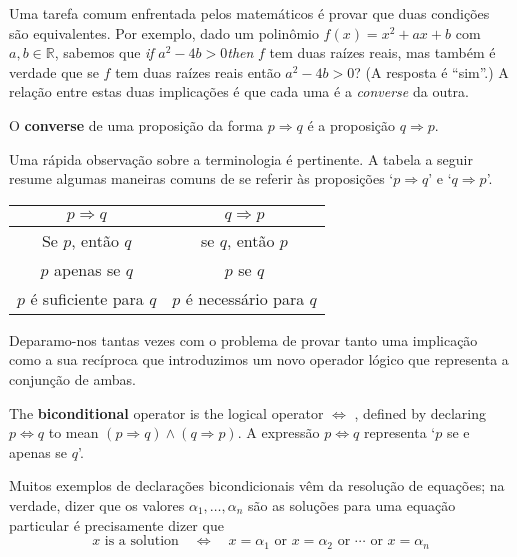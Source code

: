 \begin{estratégia}
Uma tarefa comum enfrentada pelos matemáticos é provar que duas condições são equivalentes. Por exemplo, dado um polinômio $f(x) = x^2+ax+b$ com $a,b \in \mathbb{R}$, sabemos que \textit{if} $a^2-4b>0 $\textit{then} $f$ tem duas raízes reais, mas também é verdade que se $f$ tem duas raízes reais então $a^2-4b>0$? (A resposta é “sim”.) A relação entre estas duas implicações é que cada uma é a \textit{converse} da outra.

\begin{definition}
\label{defConverse}
O \textbf{converse} de uma proposição da forma $p \Rightarrow q$ é a proposição $q \Rightarrow p$.
\end{definition}

Uma rápida observação sobre a terminologia é pertinente. A tabela a seguir resume algumas maneiras comuns de se referir às proposições `$p \Rightarrow q$' e `$q \Rightarrow p$'.

\begin{center}
\begin{tabular}{c|c}
$p \Rightarrow q$ & $q \Rightarrow p$ \\ \hline
Se $p$, então $q$ & se $q$, então $p$ \\
$p$ apenas se $q$ & $p$ se $q$ \\
$p$ é suficiente para $q$ & $p$ é necessário para $q$
\end{tabular}
\end{center}

Deparamo-nos tantas vezes com o problema de provar tanto uma implicação como a sua recíproca que introduzimos um novo operador lógico que representa a conjunção de ambas.

\begin{definition}
\label{defBiconditional}
The \textbf{biconditional} operator is the logical operator $\Leftrightarrow$ , defined by declaring $p \Leftrightarrow q$ to mean $(p \Rightarrow q) \wedge (q \Rightarrow p)$. A expressão $p \Leftrightarrow q$ representa `$p$ se e apenas se $q$'.
\end{definition}

Muitos exemplos de declarações bicondicionais vêm da resolução de equações; na verdade, dizer que os valores $\alpha_1,\dots,\alpha_n$ são as soluções para uma equação particular é precisamente dizer que
\[
x \text{ is a solution} \quad \Leftrightarrow \quad x = \alpha_1 \text{ or } x = \alpha_2 \text{ or } \cdots \text{ or } x = \alpha_n
\]


\end{estratégia}
